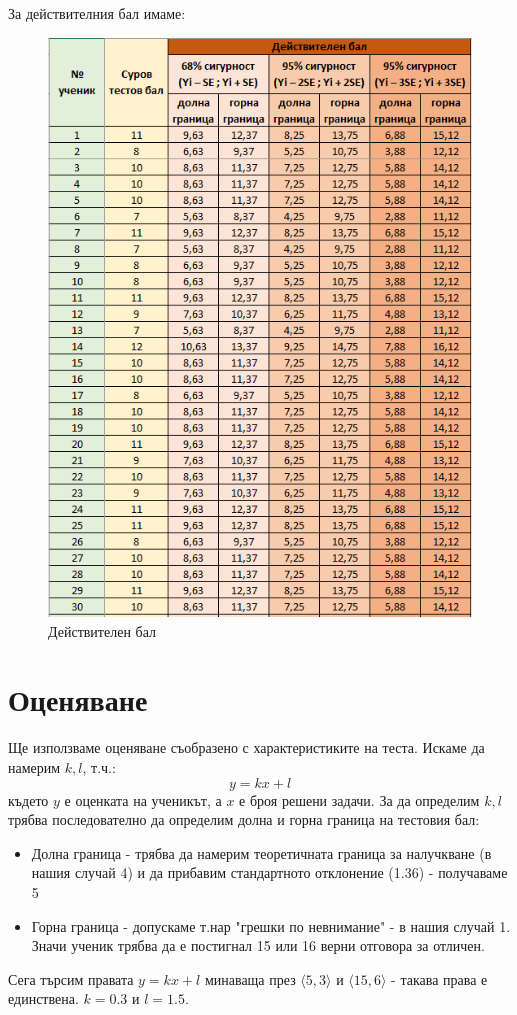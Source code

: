 За действителния бал имаме:
\begin{figure}[H]
    \centering
    \includegraphics[width=\linewidth]{resources/deistvitelen-bal.png}
    \caption{Действителен бал}
\end{figure}

\section{Оценяване}
Ще използваме оценяване съобразено с характеристиките на теста. Искаме да намерим $k, l$, т.ч.:
\begin{equation}
    y = kx + l
\end{equation}
където $y$ е оценката на ученикът, а $x$ е броя решени задачи. За да определим $k, l$ трябва последователно да определим долна и горна граница на тестовия бал:
\begin{itemize}
    \item Долна граница - трябва да намерим теоретичната граница за налучкване (в нашия случай 4) и да прибавим стандартното отклонение (1.36) - получаваме 5
    \item Горна граница - допускаме т.нар "грешки по невнимание"  -  в нашия случай 1. Значи ученик трябва да е постигнал 15 или 16 верни отговора за отличен.
\end{itemize}
Сега търсим правата $y = kx + l$ минаваща през $\langle 5, 3 \rangle$ и $\langle 15, 6\rangle$ - такава права е единствена. $k = 0.3$ и $l = 1.5$.

